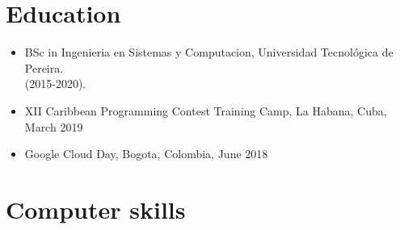\documentclass[11pt,a4paper,sans]{moderncv}        %
\begin{document}
\section{Education}
\begin{itemize}
  \item{BSc in Ingenieria en Sistemas y Computacion, Universidad Tecnológica de Pereira. \\ (2015-2020).}
  \item{XII Caribbean Programming Contest Training Camp, La Habana, Cuba, March 2019}
  \item{ Google Cloud Day, Bogota, Colombia, June 2018}
\end{itemize}



\section{Computer skills}

\nocite{*}

\end{document}
